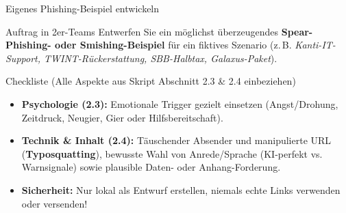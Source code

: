 \documentclass[10pt, aspectratio=169]{beamer}
\begin{document}
\begin{frame}{Eigenes Phishing-Beispiel entwickeln}
  \pause
  \begin{exampleblock}{Auftrag in 2er-Teams}
    Entwerfen Sie ein möglichst überzeugendes \textbf{Spear-Phishing- oder Smishing-Beispiel} für ein fiktives Szenario (z.\,B. \textit{Kanti-IT-Support, TWINT-Rückerstattung, SBB-Halbtax, Galaxus-Paket}).
  \end{exampleblock}

  \vspace{0.4em}
  \pause
  \begin{block}{Checkliste (Alle Aspekte aus Skript Abschnitt 2.3 \& 2.4 einbeziehen)}
    \small
    \begin{itemize}
      \item \textbf{Psychologie (2.3):} Emotionale Trigger gezielt einsetzen (Angst/Drohung, Zeitdruck, Neugier, Gier oder Hilfsbereitschaft).
      \item \textbf{Technik \& Inhalt (2.4):} Täuschender Absender und manipulierte URL (\textbf{Typosquatting}), bewusste Wahl von Anrede/Sprache (KI-perfekt vs. Warnsignale) sowie plausible Daten- oder Anhang-Forderung.
      \item \textbf{Sicherheit:} Nur lokal als Entwurf erstellen, niemals echte Links verwenden oder versenden!
    \end{itemize}
  \end{block}
\end{frame}
\end{document}
